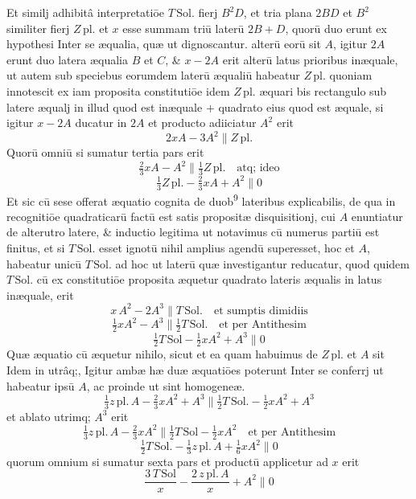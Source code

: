 \documentclass[11pt,a4paper]{article}
\begin{document}
Et similj adhibitâ interpretatiōe $T\,\mathrm{Sol.}$ fierj $B^{2}D$, et tria plana $2BD$ et $B^{2}$ similiter fierj $Z\,\mathrm{pl.}$ et $x$ esse summam triū laterū $2B + D$, quorū duo erunt ex hypothesi Inter se æqualia, quæ ut dignoscantur. alterū eorū sit $A$, igitur $2A$ erunt duo latera æqualia $B$ et $C$, \& $x - 2A$ erit alterū latus prioribus inæquale, ut autem sub speciebus eorumdem laterū æqualiū habeatur $Z\,\mathrm{pl.}$ quoniam innotescit ex iam proposita constitutiōe idem $Z\,\mathrm{pl.}$ æquari bis rectangulo sub latere æqualj in illud quod est inæquale $+$ quadrato eius quod est æquale, si igitur $x - 2A$ ducatur in $2A$ et producto adiiciatur $A^{2}$ erit
\[ 2xA - 3A^{2} \parallel Z\,\mathrm{pl.} \]
Quorū omniū si sumatur tertia pars erit
\[ \tfrac{2}{3}xA - A^{2} \parallel \tfrac{1}{3}Z\,\mathrm{pl.} \quad \text{atq; ideo} \]
\[ \tfrac{1}{3}Z\,\mathrm{pl.} - \tfrac{2}{3}xA + A^{2} \parallel 0 \]
Et sic cū sese offerat æquatio cognita de duob\textsuperscript{9} lateribus explicabilis, de qua in recognitiōe quadraticarū factū est satis propositæ disquisitionj, cui $A$ enuntiatur de alterutro latere, \& inductio legitima ut notavimus cū numerus partiū est finitus, et si $T\,\mathrm{Sol.}$ esset ignotū nihil amplius agendū superesset, hoc et $A$, habeatur unicū $T\,\mathrm{Sol.}$ ad hoc ut \ill{}  laterū quæ investigantur reducatur, quod quidem $T\,\mathrm{Sol.}$ cū ex constitutiōe proposita æquetur quadrato lateris æqualis in latus inæquale, erit
\[ x\,A^{2} - 2A^{3} \parallel T\,\mathrm{Sol.} \quad \text{et sumptis dimidiis} \]
\[ \tfrac{1}{2}xA^{2} - A^{3} \parallel \tfrac{1}{2}T\,\mathrm{Sol.} \quad \text{et per Antithesim} \]
\[ \tfrac{1}{2}T\,\mathrm{Sol} - \tfrac{1}{2}xA^{2} + A^{3} \parallel 0 \]
Quæ æquatio cū æquetur nihilo, sicut et ea quam habuimus de $Z\,\mathrm{pl.}$ et $A$ sit Idem in utrâq;, Igitur ambæ hæ duæ æquatiōes poterunt Inter se conferrj ut habeatur ipsū $A$, ac proinde ut sint homogeneæ.
\[ \tfrac{1}{3}z\,\mathrm{pl.}\,A - \tfrac{2}{3}xA^{2} + A^{3} \parallel \tfrac{1}{2}T\,\mathrm{Sol.} - \tfrac{1}{2}xA^{2} + A^{3} \]
et ablato utrimq; $A^{3}$ erit
\[ \tfrac{1}{3}z\,\mathrm{pl.}\,A - \tfrac{2}{3}xA^{2} \parallel \tfrac{1}{2}T\,\mathrm{Sol} - \tfrac{1}{2}xA^{2} \quad \text{et per Antithesim} \]
\[ \tfrac{1}{2}T\,\mathrm{Sol.} - \tfrac{1}{3}z\,\mathrm{pl.}\,A + \tfrac{1}{6}xA^{2} \parallel 0 \]
quorum omnium si sumatur sexta pars et productū applicetur ad $x$ erit
\[ \frac{3\,T\,\mathrm{Sol}}{x} - \frac{2\,z\,\mathrm{pl.}\,A}{x} + A^{2} \parallel 0 \]

\end{document}
